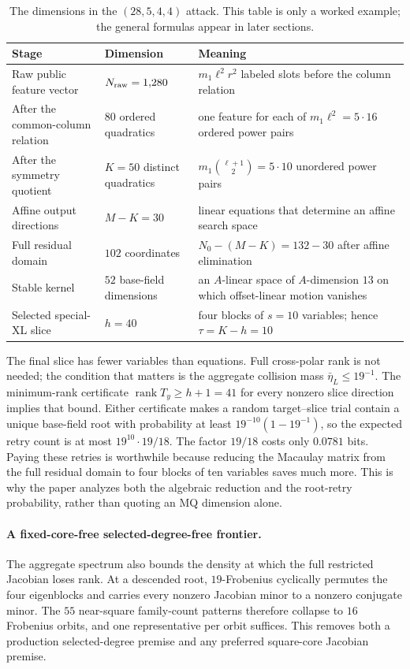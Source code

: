 \documentclass[11pt]{article}
\newcommand{\rank}{\operatorname{rank}}
\begin{document}
\begin{table}[H]
\centering
\caption{The dimensions in the $(28,5,4,4)$ attack.  This table is only a
worked example; the general formulas appear in later sections.}
\label{tab:running-example}
\small
\renewcommand{\arraystretch}{1.12}
\begin{tabularx}{0.96\textwidth}{@{}>{\raggedright\arraybackslash}p{}>{\centering\arraybackslash}p{}X@{}}
\toprule
Stage & Dimension & Meaning\\
\midrule
Raw public feature vector & $N_{\rm raw}=1{,}280$ & $m_1\ell^2r^2$ labeled slots before
the column relation\\
After the common-column relation & $80$ ordered quadratics & one feature for
each of $m_1\ell^2=5\cdot16$ ordered power pairs\\
After the symmetry quotient & $K=50$ distinct quadratics &
$m_1\binom{\ell+1}{2}=5\cdot10$ unordered power pairs\\
Affine output directions & $M-K=30$ & linear equations that determine an
affine search space\\
Full residual domain & $102$ coordinates & $N_0-(M-K)=132-30$ after affine
elimination\\
Stable kernel & $52$ base-field dimensions & an $A$-linear space of
$A$-dimension $13$ on which offset-linear motion vanishes\\
Selected special-XL slice & $h=40$ & four blocks of $s=10$ variables; hence
$\tau=K-h=10$\\
\bottomrule
\end{tabularx}
\end{table}

The final slice has fewer variables than equations.  Full cross-polar rank is
not needed; the condition that matters is the aggregate collision mass
$\bar\eta_L\le19^{-1}$.  The minimum-rank certificate $\rank T_y\ge h+1=41$ for
every nonzero slice direction implies that bound.  Either certificate makes a random target--slice trial contain a
unique base-field root with probability at least
$19^{-10}(1-19^{-1})$, so the expected retry count is at most
$19^{10}\cdot19/18$.  The factor $19/18$ costs only $0.0781$ bits.  Paying
these retries is worthwhile because reducing the Macaulay matrix from the full
residual domain to four blocks of ten variables saves much more.  This is why
the paper analyzes both the algebraic reduction and the root-retry probability,
rather than quoting an MQ dimension alone.

\paragraph{A fixed-core-free selected-degree-free frontier.}
The aggregate spectrum also bounds the density at which the full restricted
Jacobian loses rank.  At a descended root, $19$-Frobenius cyclically permutes
the four eigenblocks and carries every nonzero Jacobian minor to a nonzero
conjugate minor.  The $55$ near-square family-count patterns therefore collapse
to $16$ Frobenius orbits, and one representative per orbit suffices.  This
removes both a production selected-degree premise and any preferred square-core
Jacobian premise.
\end{document}
